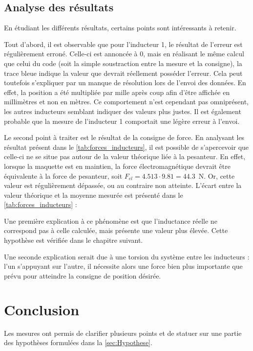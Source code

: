\subsection{Analyse des résultats}
En étudiant les différents résultats, certains points sont intéressants à retenir.

Tout d'abord, il est observable que pour l'inducteur 1, le résultat de l'erreur est régulièrement erroné. Celle-ci est annoncée à 0, mais en réalisant le même calcul que celui du code (soit la simple soustraction entre la mesure et la consigne), la trace bleue indique la valeur que devrait réellement posséder l'erreur. Cela peut toutefois s'expliquer par un manque de résolution lors de l'envoi des données. En effet, la position a été multipliée par mille après coup afin d'être affichée en millimètres et non en mètres. Ce comportement n'est cependant pas omniprésent, les autres inducteurs semblant indiquer des valeurs plus justes. Il est également probable que la mesure de l'inducteur 1 comportait une légère erreur à l'envoi.

Le second point à traiter est le résultat de la consigne de force. En analysant les résultat présent dans le \autoref{tab:forces_inducteurs}, il est possible de s'apercevoir que celle-ci ne se situe pas autour de la valeur théorique liée à la pesanteur. En effet, lorsque la maquette est en maintien, la force électromagnétique devrait être équivalente à la force de pesanteur, soit $F_{el} = 4.513\cdot9.81 = 44.3$~N. Or, cette valeur est régulièrement dépassée, ou au contraire non atteinte. L'écart entre la valeur théorique et la moyenne mesurée est présenté dans le \autoref{tab:forces_inducteurs} :

Une première explication à ce phénomène est que l'inductance réelle ne correspond pas à celle calculée, mais présente une valeur plus élevée. Cette hypothèse est vérifiée dans le chapitre suivant.

Une seconde explication serait due à une torsion du système entre les inducteurs : l'un s'appuyant sur l'autre, il nécessite alors une force bien plus importante que prévu pour atteindre la consigne de position désirée.

\section{Conclusion}
Les mesures ont permis de clarifier plusieurs points et de statuer sur une partie des hypothèses formulées dans la \autoref{sec:Hypothese}.

